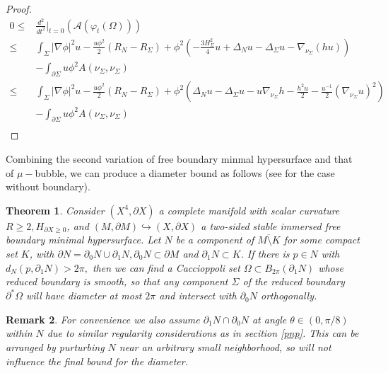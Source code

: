 \documentclass[12pt]{amsart}
\newcommand{\p}{\partial}
\newtheorem{theorem}{Theorem}[section]
\newtheorem{remark}[theorem]{Remark}
\numberwithin{equation}{section}
\begin{document}
\begin{proof}
		\begin{align*}
			0\leq &\frac{d^2}{dt^2}\Big\vert_{t=0}(\mathcal{A}(\varphi_t(\Omega)))\\
			\leq& \int_{\Sigma} |\nabla \phi|^2u  -\frac{u\phi^2}{2}(R_{N}-R_{\Sigma})+\phi^2(-\frac{3H^2_{\Sigma}}{4}u+ \Delta_N u-\Delta_{\Sigma}u-\nabla_{\nu_{\Sigma}} (hu))\\
			& -\int_{\partial \Sigma} u  \phi^2 A(\nu_{\Sigma},\nu_{\Sigma})\\
			\leq & \int_{\Sigma} |\nabla \phi|^2u  -\frac{u\phi^2}{2}(R_{N}-R_{\Sigma})+\phi^2(\Delta_N u-\Delta_{\Sigma}u-u\nabla_{\nu_{\Sigma}} h-\frac{h^2u}{2}-\frac{u^{-1}}{2}(\nabla_{\nu_{\Sigma}}u)^2)\\
			& -\int_{\partial \Sigma} u  \phi^2 A(\nu_{\Sigma},\nu_{\Sigma})\\
		\end{align*}
		
	\end{proof}







	Combining the second variation of free boundary minmal hypersurface and that of $\mu-$bubble, we can produce a diameter bound as follows (see \cite{ChodoLiStryk2022-CompleteStableMinimal} for the case without boundary).

	\begin{theorem} \label{width}
		Consider $(X^4,\p X)$ a complete manifold with scalar curvature $R\geq 2, H_{\partial X \geq 0}$, and $(M,\p M) \hookrightarrow (X,\p X)$ a two-sided stable immersed free boundary minimal hypersurface.
		Let $N$ be a component of $\overline{M \setminus K}$ for some compact set $K$, with $\p N =\p_0 N \cup \p_1 N, \p_0 N \subset \p M$ and $\p_1 N \subset K$. If there is $p\in N$ with $d_N(p,\p_1 N)>2\pi,$ then we can find a Caccioppoli set $\Omega \subset B_{2\pi}(\p_1N)$ whose reduced boundary is smooth, so that any component $\Sigma$ of the reduced boundary $\p^{*}\Omega$ will have diameter at most $2\pi$ and intersect with $\p_0 N$ orthogonally.
	\end{theorem}
	
	\begin{remark}
		For convenience we also assume $\partial_1 N\cap \partial_0 N$ at angle $\theta \in (0,\pi/8)$ within $N$ due to similar regularity considerations as in secition \ref{pnp}. This  can be arranged by purturbing $N$ near an arbitrary small neighborhood, so will not influence the final bound for the diameter.
	\end{remark}
\end{document}
